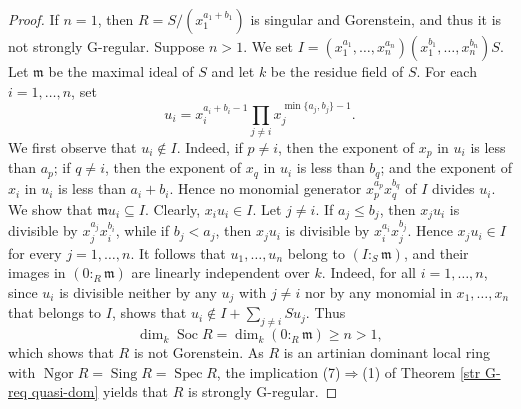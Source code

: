 \documentclass{amsart}
\theoremstyle{definition}
\theoremstyle{remark}
\numberwithin{equation}{thm}
\def\ge{\geqslant}
\def\le{\leqslant}
\def\m{\mathfrak{m}}
\def\ng{\operatorname{Ngor}}
\def\sing{\operatorname{Sing}}
\def\spec{\operatorname{Spec}}
\begin{document}
\begin{proof}
If $n=1$, then $R=S/(x_1^{a_1+b_1})$ is singular and Gorenstein, and thus it is not strongly G-regular. Suppose $n>1$. We set $I=(x_1^{a_1},\ldots,x_n^{a_n})(x_1^{b_1},\ldots,x_n^{b_n})S$. 
Let $\m$ be the maximal ideal of $S$ and let $k$ be the residue field of $S$. For each $i=1,\ldots,n$, set
$$
u_i=x_i^{a_i+b_i-1}\prod_{j\ne i}x_j^{\min\{a_j,b_j\}-1}.
$$
We first observe that $u_i\notin I$. Indeed, if $p\ne i$, then the exponent of $x_p$ in $u_i$ is less than $a_p$; if $q\ne i$, then the exponent of $x_q$ in $u_i$ is less than $b_q$; and the exponent of $x_i$ in $u_i$ is less than $a_i+b_i$. Hence no monomial generator $x_p^{a_p}x_q^{b_q}$ of $I$ divides $u_i$.
We show that $\m u_i\subseteq I$. Clearly, $x_i u_i\in I$. Let $j\ne i$. If $a_j\le b_j$, then $x_j u_i$ is divisible by $x_j^{a_j}x_i^{b_i}$, while if $b_j<a_j$, then $x_j u_i$ is divisible by $x_i^{a_i}x_j^{b_j}$. Hence $x_j u_i\in I$ for every $j=1,\ldots,n$. 
It follows that $u_1,\ldots,u_n$ belong to $(I:_S\m)$, and their images in $(0:_R\m)$ are linearly independent over $k$. Indeed, for all $i=1,\ldots,n$, since $u_i$ is divisible neither by any $u_j$ with $j\ne i$ nor by any monomial in $x_1,\ldots,x_n$ that belongs to $I$, \cite[Corollary 3]{KiSt} shows that $u_i\notin I+ \sum_{j\ne i} S u_j$. Thus
$$
\dim_k \operatorname{Soc} R=\dim_k (0:_R\m)\ge n>1,
$$
which shows that $R$ is not Gorenstein.
As $R$ is an artinian dominant local ring with $\ng R=\sing R=\spec R$, the implication (7)$\Rightarrow$(1) of Theorem \ref{str G-req quasi-dom} yields that $R$ is strongly G-regular.
\end{proof}
\end{document}
